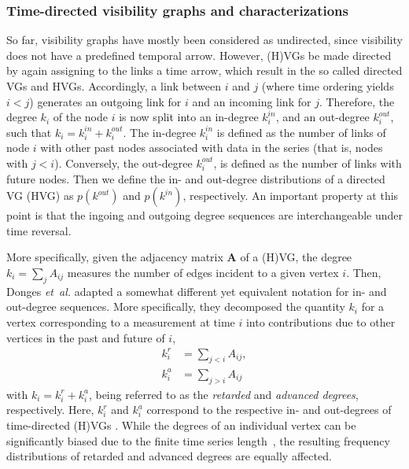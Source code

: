 		\subsubsection{Time-directed visibility graphs and characterizations}
		So far, visibility graphs have mostly been considered as undirected, since visibility does not have a predefined temporal arrow. However, (H)VGs be made directed by again assigning to the links a time arrow, which result in the so called directed VGs and HVGs. Accordingly, a link between $i$ and $j$ (where time ordering yields $i< j$) generates an outgoing link for $i$ and an incoming link for $j$. Therefore, the degree $k_i$ of the node $i$ is now split into an in-degree $k_i^{in}$, and an out-degree $k_i^{out}$, such that $k_i= k_i^{in}+k_i^{out}$. The in-degree $k_i^{in}$ is defined as the number of links of node $i$ with other past nodes associated with data in the series (that is, nodes with $j < i$). Conversely, the out-degree $k_i^{out}$, is defined as the number of links with future nodes. Then we define the in- and out-degree distributions of a directed VG (HVG) as $p(k^{out})$ and $p(k^{in})$, respectively. An important property at this point is that the ingoing and outgoing degree sequences are interchangeable under time reversal. 
		
		More specifically, given the adjacency matrix $\mathbf{A}$ of a (H)VG, the degree {$k_i =\sum_{j} A_{ij}$} measures the number of edges incident to a given vertex {$i$}. Then, Donges \textit{et~al.} \cite{Donner2012Nolta,Donges2013} adapted a somewhat different yet equivalent notation for in- and out-degree sequences. More specifically, they decomposed the quantity $k_i$ for a vertex corresponding to a measurement at time $i$ into contributions due to other vertices in the past and future of $i$,
\begin{eqnarray} \label{eq:kvin}
k_i^r &= \sum_{j<i} A_{ij},\\ \label{eq:kvout}
k_i^a &= \sum_{j>i} A_{ij}
\end{eqnarray}
with $k_i=k_i^r+k_i^a$, being referred to as the \emph{retarded} and \emph{advanced degrees}, respectively. Here, $k_i^r$ and $k_i^a$ correspond to the respective in- and out-degrees of time-directed (H)VGs \cite{Lacasa2012}. While the degrees of an individual vertex can be significantly biased due to the finite time series length~\cite{Donner2012}, the resulting frequency distributions of retarded and advanced degrees are equally affected. 

